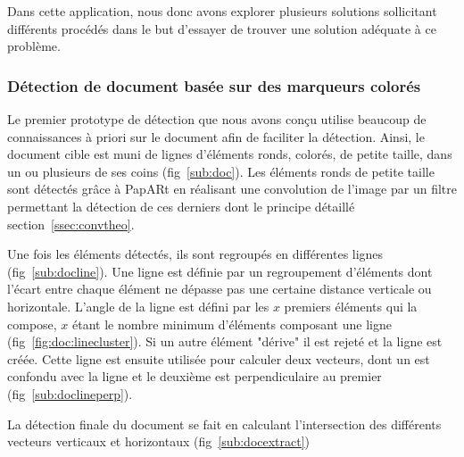 Dans cette application, nous donc avons explorer plusieurs solutions sollicitant différents procédés dans le but d'essayer de trouver une solution adéquate à ce problème.

\subsubsection{Détection de document basée sur des marqueurs colorés} Le premier prototype de détection que nous avons conçu utilise beaucoup de connaissances à priori sur le document afin de faciliter la détection. Ainsi, le document cible est muni de lignes d'éléments ronds, colorés, de petite taille, dans un ou plusieurs de ses coins (fig~\ref{sub:doc}). Les éléments ronds de petite taille sont détectés grâce à PapARt en réalisant une convolution de l'image par un filtre permettant la détection de ces derniers dont le principe détaillé section~\ref{ssec:convtheo}.

Une fois les éléments détectés, ils sont regroupés en différentes lignes (fig~\ref{sub:docline}).
Une ligne est définie par un regroupement d'éléments dont l'écart entre chaque élément ne dépasse pas une certaine distance verticale ou horizontale. L'angle de la ligne est défini par les $x$ premiers éléments qui la compose, $x$ étant le nombre minimum d'éléments composant une ligne (fig~\ref{fig:doc:linecluster}). Si un autre élément "dérive" il est rejeté et la ligne est créée. Cette ligne est ensuite utilisée pour calculer deux vecteurs, dont un est confondu avec la ligne et le deuxième est perpendiculaire au premier (fig~\ref{sub:doclineperp}).

La détection finale du document se fait en calculant l'intersection des différents vecteurs verticaux et horizontaux (fig~\ref{sub:docextract})


